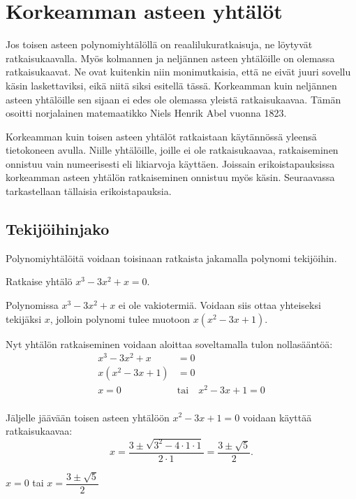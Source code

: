 \section{Korkeamman asteen yhtälöt}


Jos toisen asteen polynomiyhtälöllä on reaalilukuratkaisuja, ne löytyvät ratkaisukaavalla.
Myös kolmannen ja neljännen asteen yhtälöille on olemassa ratkaisukaavat.
Ne ovat kuitenkin niin monimutkaisia, että ne eivät juuri sovellu käsin laskettaviksi, eikä niitä siksi esitellä tässä.
Korkeamman kuin neljännen asteen yhtälöille sen sijaan ei edes ole olemassa yleistä ratkaisukaavaa.
Tämän osoitti norjalainen matemaatikko Niels Henrik Abel vuonna 1823.

Korkeamman kuin toisen asteen yhtälöt ratkaistaan käytännössä yleensä tietokoneen avulla.
Niille yhtälöille, joille ei ole ratkaisukaavaa, ratkaiseminen onnistuu vain numeerisesti eli likiarvoja käyttäen.
Joissain erikoistapauksissa korkeamman asteen yhtälön ratkaiseminen onnistuu myös käsin.
Seuraavassa tarkastellaan tällaisia erikoistapauksia.

\subsection*{Tekijöihinjako}

Polynomiyhtälöitä voidaan toisinaan ratkaista jakamalla polynomi tekijöihin.


\begin{esimerkki}
Ratkaise yhtälö $x^3 - 3x^2 + x = 0$.

\begin{esimratk}
Polynomissa $x^3 - 3x^2 + x$ ei ole vakiotermiä. Voidaan siis ottaa yhteiseksi tekijäksi $x$, jolloin polynomi tulee muotoon $x(x^2 - 3x + 1)$. 

Nyt yhtälön ratkaiseminen voidaan aloittaa soveltamalla tulon nollasääntöä:
\begin{align*}
x^3 - 3x^2 + x & =0 \\
x(x^2 - 3x + 1) & =0 \\
x=0 \quad & \text{tai} \quad x^2 - 3x + 1 = 0 \\
\end{align*}

Jäljelle jäävään toisen asteen yhtälöön $x^2 - 3x + 1 = 0$ voidaan käyttää ratkaisukaavaa:
\[
x =\frac{3\pm\sqrt{3^2-4\cdot 1\cdot 1}}{2\cdot 1}=\frac{3\pm \sqrt{5}}{2}.
\]
\end{esimratk}

\begin{esimvast} $x=0$ tai $x=\dfrac{3\pm \sqrt{5}}{2}$
\end{esimvast}
\end{esimerkki}

